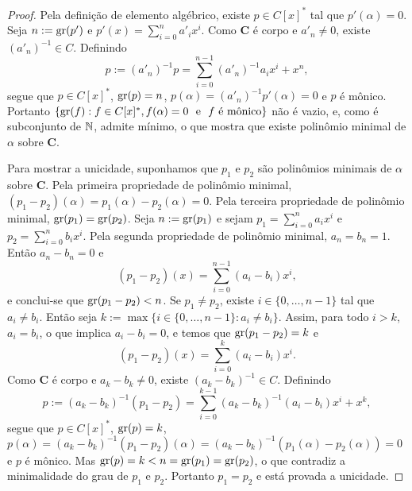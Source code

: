 \begin{proof}
	Pela definição de elemento algébrico, existe $p \in C[x]^*$ tal que $p'(\alpha)=0$. Seja $n := \operatorname{gr}(p')$ e $p'(x) = \sum_{i=0}^n a'_ix^i$. Como $\bm C$ é corpo e $a'_n \neq 0$, existe $(a'_n)^{-1} \in C$. Definindo
	\begin{equation*}
	p := (a'_n)^{-1}p = \sum_{i=0}^{n-1} (a'_n)^{-1}a_ix^i + x^n,
	\end{equation*}
segue que $p \in C[x]^*$, $\operatorname{gr}(p)=n$, $p(\alpha) = (a'_n)^{-1}p'(\alpha)=0$ e $p$ é mônico. Portanto $\{\operatorname{gr}(f) : f \in C[x]^*, f(\alpha)=0 \text{\ \ e\ \ } f \text{\ é mônico}\}$ não é vazio, e, como é subconjunto de $\mathbb{N}$, admite mínimo, o que mostra que existe polinômio minimal de $\alpha$ sobre $\bm C$.

	Para mostrar a unicidade, suponhamos que $p_1$ e $p_2$ são polinômios minimais de $\alpha$ sobre $\bm C$. Pela primeira propriedade de polinômio minimal, $(p_1-p_2)(\alpha)=p_1(\alpha)-p_2(\alpha)=0$. Pela terceira propriedade de polinômio minimal, $\operatorname{gr}(p_1)=\operatorname{gr}(p_2)$. Seja $n := \operatorname{gr}(p_1)$ e sejam $p_1 = \sum_{i=0}^n a_ix^i$ e $p_2 = \sum_{i=0}^n b_ix^i$. Pela segunda propriedade de polinômio minimal, $a_n=b_n=1$. Então $a_n-b_n=0$ e
	\begin{equation*}
	(p_1-p_2)(x) = \sum_{i=0}^{n-1} (a_i-b_i)x^i,
	\end{equation*}
e conclui-se que $\operatorname{gr}(p_1-p_2) < n$. Se $p_1 \neq p_2$, existe $i \in \{0,\ldots,n-1\}$ tal que $a_i \neq b_i$. Então seja $k := \max\{i \in \{0,\ldots,n-1\} : a_i \neq b_i\}$. Assim, para todo $i > k$, $a_i = b_i$, o que implica $a_i-b_i=0$, e temos que $\operatorname{gr}(p_1-p_2)=k$ e
	\begin{equation*}
	(p_1-p_2)(x) = \sum_{i=0}^{k} (a_i-b_i)x^i.
	\end{equation*}
Como $\bm C$ é corpo e $a_k-b_k \neq 0$, existe $(a_k-b_k)^{-1} \in C$. Definindo
	\begin{equation*}
	p := (a_k-b_k)^{-1}(p_1-p_2) = \sum_{i=0}^{k-1} (a_k-b_k)^{-1}(a_i-b_i)x^i + x^k,
	\end{equation*}
 segue que $p \in C[x]^*$, $\operatorname{gr}(p)=k$, $p(\alpha)=(a_k-b_k)^{-1}(p_1-p_2)(\alpha)=(a_k-b_k)^{-1}(p_1(\alpha)-p_2(\alpha))=0$ e $p$ é mônico. Mas $\operatorname{gr}(p) = k < n = \operatorname{gr}(p_1) = \operatorname{gr}(p_2)$, o que contradiz a minimalidade do grau de $p_1$ e $p_2$. Portanto $p_1=p_2$ e está provada a unicidade.
\end{proof}

